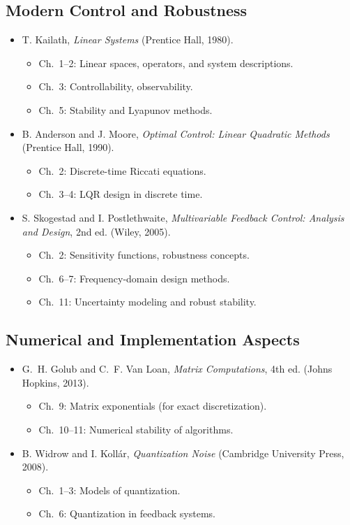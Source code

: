 \documentclass[11pt,a4paper]{article}
\begin{document}
	\subsection*{Modern Control and Robustness}
	\begin{itemize}
		\item T. Kailath, \emph{Linear Systems} (Prentice Hall, 1980).  
		\begin{itemize}
			\item Ch.~1--2: Linear spaces, operators, and system descriptions.  
			\item Ch.~3: Controllability, observability.  
			\item Ch.~5: Stability and Lyapunov methods.  
		\end{itemize}
		\item B. Anderson and J. Moore, \emph{Optimal Control: Linear Quadratic Methods} (Prentice Hall, 1990).  
		\begin{itemize}
			\item Ch.~2: Discrete-time Riccati equations.  
			\item Ch.~3--4: LQR design in discrete time.  
		\end{itemize}
		\item S. Skogestad and I. Postlethwaite, \emph{Multivariable Feedback Control: Analysis and Design}, 2nd ed. (Wiley, 2005).  
		\begin{itemize}
			\item Ch.~2: Sensitivity functions, robustness concepts.  
			\item Ch.~6--7: Frequency-domain design methods.  
			\item Ch.~11: Uncertainty modeling and robust stability.  
		\end{itemize}
	\end{itemize}
	
	\subsection*{Numerical and Implementation Aspects}
	\begin{itemize}
		\item G.~H. Golub and C.~F. Van Loan, \emph{Matrix Computations}, 4th ed. (Johns Hopkins, 2013).  
		\begin{itemize}
			\item Ch.~9: Matrix exponentials (for exact discretization).  
			\item Ch.~10--11: Numerical stability of algorithms.  
		\end{itemize}
		\item B. Widrow and I. Kollár, \emph{Quantization Noise} (Cambridge University Press, 2008).  
		\begin{itemize}
			\item Ch.~1--3: Models of quantization.  
			\item Ch.~6: Quantization in feedback systems.  
		\end{itemize}
	\end{itemize}
\end{document}
